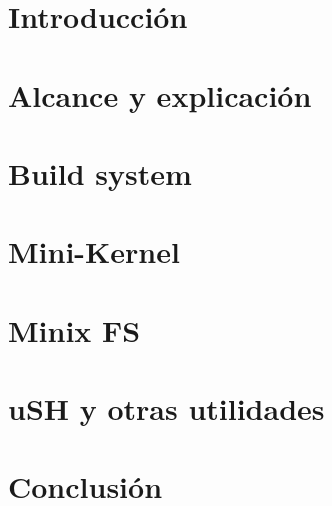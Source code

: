 \section{Introducción}


\section{Alcance y explicación}


\section{Build system}


\section{Mini-Kernel}


\section{Minix FS}


\section{uSH y otras utilidades}


\section{Conclusión}

